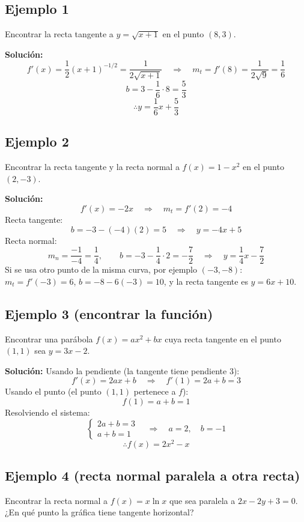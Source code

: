 \documentclass[12pt]{article}
\begin{document}
\subsection{Ejemplo 1}
Encontrar la recta tangente a $y = \sqrt{x + 1}$ en el punto $(8, 3)$.

\textbf{Solución:}
\[
f'(x) = \frac{1}{2}(x + 1)^{-1/2} = \frac{1}{2\sqrt{x + 1}} \quad \Rightarrow \quad m_t = f'(8) = \frac{1}{2\sqrt{9}} = \frac{1}{6}
\]
\[
b = 3 - \frac{1}{6} \cdot 8 = \frac{5}{3}
\]
\[
\therefore y = \frac{1}{6}x + \frac{5}{3}
\]

\subsection{Ejemplo 2}
Encontrar la recta tangente y la recta normal a $f(x) = 1 - x^2$ en el punto $(2, -3)$.

\textbf{Solución:}
\[
f'(x) = -2x \quad \Rightarrow \quad m_t = f'(2) = -4
\]
Recta tangente:
\[
b = -3 - (-4)(2) = 5 \quad \Rightarrow \quad y = -4x + 5
\]
Recta normal:
\[
m_n = \frac{-1}{-4} = \frac{1}{4}, \qquad b = -3 - \frac{1}{4} \cdot 2 = -\frac{7}{2} \quad \Rightarrow \quad y = \frac{1}{4}x - \frac{7}{2}
\]
Si se usa otro punto de la misma curva, por ejemplo $(-3, -8)$: $m_t = f'(-3) = 6$, $b = -8 - 6(-3) = 10$, y la recta tangente es $y = 6x + 10$.

\subsection{Ejemplo 3 (encontrar la función)}
Encontrar una parábola $f(x) = ax^2 + bx$ cuya recta tangente en el punto $(1, 1)$ sea $y = 3x - 2$.

\textbf{Solución:} Usando la pendiente (la tangente tiene pendiente $3$):
\[
f'(x) = 2ax + b \quad \Rightarrow \quad f'(1) = 2a + b = 3
\]
Usando el punto (el punto $(1, 1)$ pertenece a $f$):
\[
f(1) = a + b = 1
\]
Resolviendo el sistema:
\[
\begin{cases}
2a + b = 3 \\
a + b = 1
\end{cases}
\quad \Rightarrow \quad a = 2, \quad b = -1
\]
\[
\therefore f(x) = 2x^2 - x
\]

\subsection{Ejemplo 4 (recta normal paralela a otra recta)}
Encontrar la recta normal a $f(x) = x \ln x$ que sea paralela a $2x - 2y + 3 = 0$. ¿En qué punto la gráfica tiene tangente horizontal?
\end{document}

